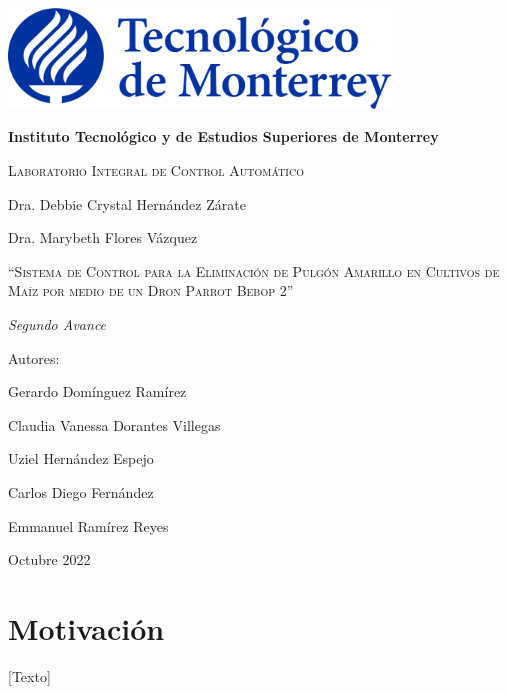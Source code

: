 \documentclass[11pt]{exam}
\begin{document}
    \begin{titlepage}
        \centering
        {\includegraphics[width = 4in]{pictures/itesm-logo.png}\par}
        \vspace{0.4in}
        {\bfseries\LARGE Instituto Tecnol\'ogico y de Estudios Superiores de Monterrey \par}
        \vspace{0.4in}
        {\scshape\Large Laboratorio Integral de Control Automático \par}
        {\Large Dra. Debbie Crystal Hernández Zárate \par}
        {\Large Dra. Marybeth Flores Vázquez \par}
        \vspace{1.2in}
        {\scshape\Large ``Sistema de Control para la Eliminaci\'on de Pulg\'on Amarillo en Cultivos de Maíz por medio de un Dron Parrot Bebop 2'' \par}
        \vspace{1.2in}
        {\itshape\Large Segundo Avance \par}
        \vfill
        {\Large Autores: \par}
        {\Large Gerardo Dom\'inguez Ram\'irez\par}
        {\Large Claudia Vanessa Dorantes Villegas\par}
        {\Large Uziel Hernández Espejo\par}
        {\Large Carlos Diego Fernández\par}
        {\Large Emmanuel Ramírez Reyes\par}
        \vfill
        {\Large Octubre 2022 \par}
    \end{titlepage}

    \headrule
    \footrule

    \section*{Motivaci\'on}
        [Texto]
\end{document}
